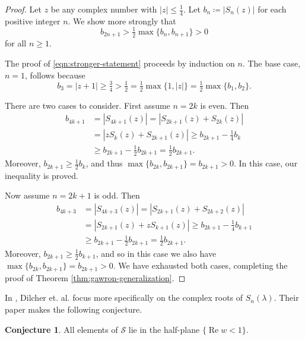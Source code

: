 \documentclass[11pt]{article}
\theoremstyle{definition}
\newtheorem{conj}{Conjecture}
\newcommand{\stern}[2]{S_{#1}(#2)}
\renewcommand{\Re}{\operatorname{Re}}
\newcommand{\lm}{\lambda}
\newcommand{\calS}{\mathcal S}
\begin{document}
\begin{proof}
	Let $z$ be any complex number with $|z| \leq \tfrac 14$.  Let $b_n\coloneqq |\stern n z|$ for each positive integer $n$.  We show more strongly that
	\begin{equation}\label{eqn:stronger-statement}
		b_{2n+1} > \tfrac12\max\{b_n,b_{n+1}\} > 0
	\end{equation}
	for all $n\geq 1$.
	
	\par The proof of \eqref{eqn:stronger-statement} proceeds by induction on $n$.  The base case, $n = 1$, follows because
	\[
	b_3 = |z + 1| \geq \tfrac 34 > \tfrac 12 
	= \tfrac 12\max\{1, |z|\} = \tfrac 12\max\{b_1,b_2\}.
	\]
	
	\par There are two cases to consider.  First assume $n=2k$ is even.  Then
	\begin{align*}
		b_{4k+1} &= |\stern{4k+1}z| = |\stern{2k+1} z + \stern{2k} z|\\
		&= |z \stern kz + \stern{2k+1} z| \geq b_{2k+1} - \tfrac14 b_k\\
		&\geq b_{2k+1} - \tfrac12 b_{2k+1} = \tfrac12 b_{2k+1}.
	\end{align*}
	Moreover, $b_{2k+1} \geq \frac12 b_k$, and thus $\max\{b_{2k},b_{2k+1}\} = b_{2k+1} > 0$.  In this case, our inequality is proved.
	
	\par Now assume $n = 2k + 1$ is odd.  Then
	\begin{align*}
		b_{4k+3} &= |\stern{4k+3}z| = |\stern{2k+1} z + \stern{2k+2} z|\\
		&= |\stern{2k+1} z + z\stern{k+1} z| \geq b_{2k+1} - \frac 14 b_{k+1}\\
		&\geq b_{2k+1} - \tfrac12 b_{2k+1} = \tfrac12 b_{2k+1}.
	\end{align*}
	Moreover, $b_{2k+1} \geq \frac12 b_{k+1}$, and so in this case we also have $\max\{b_{2k},b_{2k+1}\} = b_{2k+1} > 0$.  We have exhausted both cases, completing the proof of Theorem \ref{thm:gawron-generalization}.
\end{proof}

In \cite{Dilcher2017}, Dilcher et. al. focus more specifically on the complex roots of $\stern n\lm$.  Their paper makes the following conjecture.

\begin{conj}\label{conj:location-roots}
	All elements of $\calS$ lie in the half-plane $\{\Re w < 1\}$. 
\end{conj}
\end{document}
